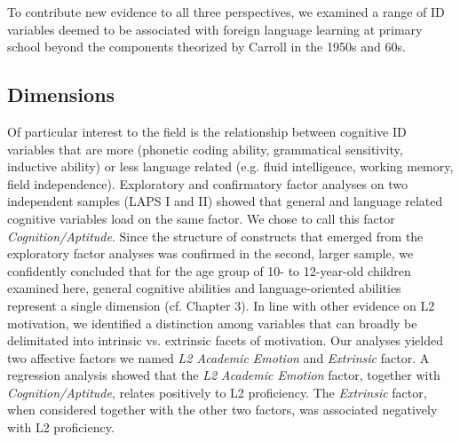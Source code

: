\documentclass[output=paper]{langsci/langscibook}
\begin{document}
To contribute new evidence to all three perspectives, we examined a range of ID variables deemed to be associated with foreign language learning at primary school beyond the components theorized by Carroll in the 1950s and 60s.

\subsection{Dimensions}

Of particular interest to the field is the relationship between cognitive ID variables that are more (phonetic coding ability, grammatical sensitivity, inductive ability) or less language related (e.g. fluid intelligence, working memory, field independence). Exploratory and confirmatory factor analyses on two independent samples (LAPS I and II) showed that general and language related cognitive variables load on the same factor. We chose to call this factor \textit{Cognition/Aptitude}. Since the structure of constructs that emerged from the exploratory factor analyses was confirmed in the second, larger sample, we confidently concluded that for the age group of 10- to 12-year-old children examined here, general cognitive abilities and language-oriented abilities represent a single dimension (cf. Chapter 3). In line with other evidence on L2 motivation, we identified a distinction among variables that can broadly be delimitated into intrinsic vs. extrinsic facets of motivation. Our analyses yielded two affective factors we named \textit{L2 Academic Emotion} and \textit{Extrinsic} factor. A regression analysis showed that the \textit{L2 Academic Emotion} factor, together with \textit{Cognition/Aptitude}, relates positively to L2 proficiency. The \textit{Extrinsic} factor, when considered together with the other two factors, was associated negatively with L2 proficiency.
\end{document}
